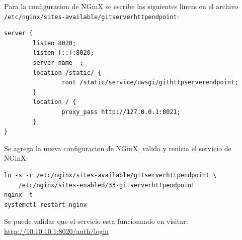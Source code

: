 Para la configuracion de NGinX se escribe las siguientes lineas en el archivo \\
\texttt{/etc/nginx/sites-available/gitserverhttpendpoint}:
\begin{lstlisting}
server {
        listen 8020;
        listen [::]:8020;
        server_name _;
        location /static/ {
                root /static/service/uwsgi/githttpserverendpoint;
        }
        location / {
                proxy_pass http://127.0.0.1:8021;
        }
}
\end{lstlisting}

Se agrega la nueva configuracion de NGinX, valida y renicia el servicio de NGinX:
\begin{lstlisting}
ln -s -r /etc/nginx/sites-available/gitserverhttpendpoint \ 
    /etc/nginx/sites-enabled/33-gitserverhttpendpoint
nginx -t
systemctl restart nginx
\end{lstlisting}

Se puede validar que el servicio esta funcionando en visitar: \url{http://10.10.10.1:8020/auth/login}

